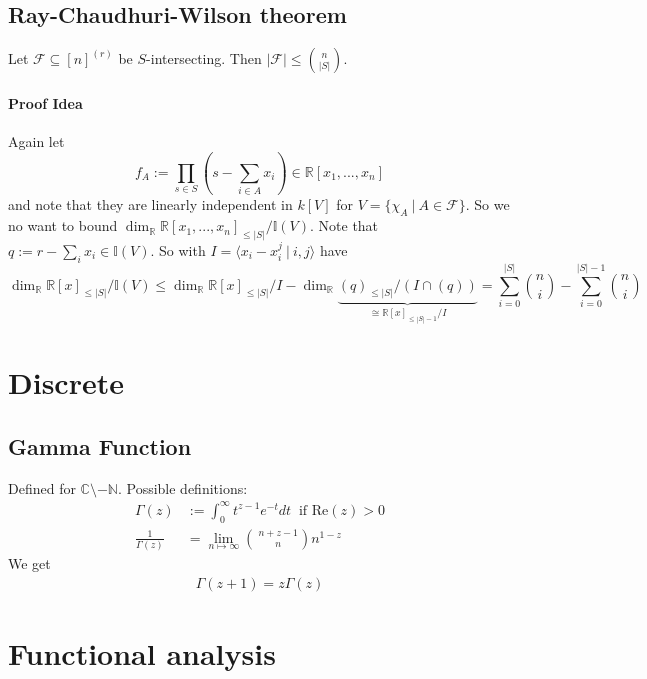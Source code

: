 \documentclass{scrartcl}
\newcommand{\R}{\mathbb{R}}
\newcommand{\I}{\mathbb{I}}
\begin{document}
\subsection{Ray-Chaudhuri-Wilson theorem}
Let $\mathcal{F} \subseteq [n]^{(r)}$ be $S$-intersecting. Then $|\mathcal{F}| \leq {n \choose |S|}$.
\paragraph{Proof Idea} Again let
\begin{equation*}
    f_A := \prod_{s \in S} (s - \sum_{i \in A} x_i) \in \R[x_1, ..., x_n]
\end{equation*}
and note that they are linearly independent in $k[V]$ for $V = \{ \chi_A \ | \ A \in \mathcal{F} \}$.
So we no want to bound $\dim_\R \R[x_1, ..., x_n]_{\leq |S|} / \I(V)$.
Note that $q := r - \sum_i x_i \in \I(V)$. So with $I = \langle x_i - x_i^j \ | \ i, j \rangle$ have
\begin{equation*}
    \dim_\R \R[x]_{\leq |S|} / \I(V) \leq \dim_\R \R[x]_{\leq |S|} / I - \dim_\R \underbrace{(q)_{\leq |S|} / (I \cap (q))}_{\cong \R[x]_{\leq |S| - 1} / I} = \sum_{i = 0}^{|S|} {n \choose i} - \sum_{i = 0}^{|S| - 1} {n \choose i}
\end{equation*}

\section{Discrete}

\subsection{Gamma Function}
Defined for $\mathbb{C} \setminus -\mathbb{N}$. Possible definitions:
\begin{equation}
    \begin{split}
        \Gamma(z) &:= \int_0^{\infty} t^{z - 1} e^{-t} dt \ \text{ if } \text{Re}(z) > 0\\
        \frac 1 {\Gamma(z)} &= \lim_{n \mapsto \infty} {\ n + z - 1 \choose\ n } n^{1-z}\nonumber
    \end{split}
\end{equation}
We get
\begin{equation}
    \begin{split}
        \Gamma(z + 1) = z\Gamma(z) \nonumber
    \end{split}
\end{equation}

\section{Functional analysis}
\end{document}
